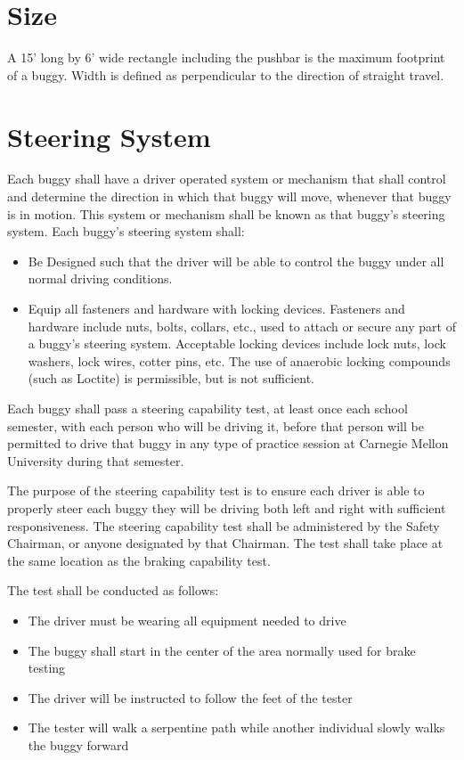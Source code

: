 \section{Size}

	A 15' long by 6' wide rectangle including the pushbar is the maximum footprint of a buggy. Width is defined as perpendicular to the direction of straight travel.

\section{Steering System}

	Each buggy shall have a driver operated system or mechanism that shall control and determine the direction in which that buggy will move, whenever that buggy is in motion. This system or mechanism shall be known as that buggy's steering system. Each buggy's steering system shall:

	\begin{itemize}

		\item
		Be Designed such that the driver will be able to control the buggy under all normal driving conditions.

		\item
		Equip all fasteners and hardware with locking devices. Fasteners and hardware include nuts, bolts, collars, etc., used to attach or secure any part of a buggy's steering system. Acceptable locking devices include lock nuts, lock washers, lock wires, cotter pins, etc. The use of anaerobic locking compounds (such as Loctite) is permissible, but is not sufficient.

	\end{itemize}

Each buggy shall pass a steering capability test, at least once each school semester, with each person who will be driving it, before that person will be permitted to drive that buggy in any type of practice session at Carnegie Mellon University during that semester. 

The purpose of the steering capability test is to ensure each driver is able to properly steer each buggy they will be driving both left and right with sufficient responsiveness. The steering capability test shall be administered by the Safety Chairman, or anyone designated by that Chairman. The test shall take place at the same location as the braking capability test. 

The test shall be conducted as follows: 
\begin{itemize}
	\item	
	The driver must be wearing all equipment needed to drive

	\item
	The buggy shall start in the center of the area normally used for brake testing
	
	\item
	The driver will be instructed to follow the feet of the tester

	\item
	The tester will walk a serpentine path while another individual slowly walks the buggy forward
\end{itemize}

